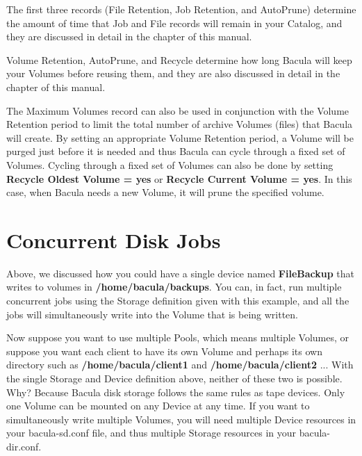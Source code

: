 The first three records (File Retention, Job Retention, and AutoPrune)
determine the amount of time that Job and File records will remain in your
Catalog, and they are discussed in detail in the 
 chapter of
this manual. 

Volume Retention, AutoPrune, and Recycle determine how long Bacula will keep
your Volumes before reusing them, and they are also discussed in detail in the
 chapter of
this manual. 

The Maximum Volumes record can also be used in conjunction with the Volume
Retention period to limit the total number of archive Volumes (files) that
Bacula will create. By setting an appropriate Volume Retention period, a
Volume will be purged just before it is needed and thus Bacula can cycle
through a fixed set of Volumes. Cycling through a fixed set of Volumes can
also be done by setting {\bf Recycle Oldest Volume = yes} or {\bf Recycle
Current Volume = yes}. In this case, when Bacula needs a new Volume, it will
prune the specified volume. 

\label{ConcurrentDiskJobs}
\section{Concurrent Disk Jobs}
Above, we discussed how you could have a single device named {\bf
FileBackup} that writes to volumes in {\bf /home/bacula/backups}. 
You can, in fact, run multiple concurrent jobs using the 
Storage definition given with this example, and all the jobs will
simultaneously write into the Volume that is being written.

Now suppose you want to use multiple Pools, which means multiple
Volumes, or suppose you want each client to have its own Volume
and perhaps its own directory such as {\bf /home/bacula/client1}
and {\bf /home/bacula/client2} ... With the single Storage and Device
definition above, neither of these two is possible.  Why?  Because
Bacula disk storage follows the same rules as tape devices. Only
one Volume can be mounted on any Device at any time. If you want
to simultaneously write multiple Volumes, you will need multiple
Device resources in your bacula-sd.conf file, and thus multiple
Storage resources in your bacula-dir.conf.

